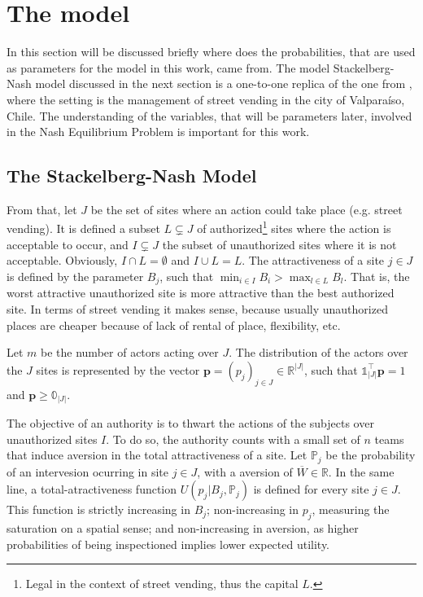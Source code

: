 \documentclass{article}
\newcommand{\pp}{\mathbf{p}}
\newcommand{\p}{\mathds{P}}
\begin{document}
\section{The model}\label{sec2}
In this section will be discussed briefly where does the probabilities, that are used as parameters for the model in this work, came from. The model Stackelberg-Nash model discussed in the next section is a one-to-one replica of the one from \citep{Carrasco}, where the setting is the management of street vending in the city of Valparaíso, Chile. The understanding of the variables, that will be parameters later, involved in the Nash Equilibrium Problem is important for this work.\par

\subsection{The Stackelberg-Nash Model}\label{sec2:SNG}
From that, let $J$ be the set of sites where an action could take place (e.g. street vending). It is defined a subset $L \subsetneq J$ of authorized\footnote{Legal in the context of street vending, thus the capital $L$.} sites where the action is acceptable to occur, and $I\subsetneq J$ the subset of unauthorized sites where it is not acceptable. Obviously, $I \cap L = \emptyset$ and $I \cup L = L$. The attractiveness of a site $j \in J$ is defined by the parameter $B_j$, such that $\min_{i \in I} B_i > \max_{l \in L} B_l$. That is, the worst attractive unauthorized site is more attractive than the best authorized site. In terms of street vending it makes sense, because usually unauthorized places are cheaper because of lack of rental of place, flexibility, etc.\par
Let $m$ be the number of actors acting over $J$. The distribution of the actors over the $J$ sites is represented by the vector $\pp = (p_j)_{j\in J} \in \mathbb{R}^{|J|}$, such that $\mathbb{1}_{|J|}^\top\pp = 1$ and $\pp \geq \mathbb{0}_{|J|}$.\par
The objective of an authority is to thwart the actions of the subjects over unauthorized sites $I$. To do so, the authority counts with a small set of $n$ teams that induce aversion in the total attractiveness of a site. Let $\p_j$ be the probability of an intervesion ocurring in site $j \in J$, with a aversion of $\overline{W} \in \mathbb{R}$. In the same line, a total-atractiveness function $U(p_j \vert B_j, \p_j)$ is defined for every site $j \in J$. This function is strictly increasing in $B_j$; non-increasing in $p_j$, measuring the saturation on a spatial sense; and non-increasing in aversion, as higher probabilities of being inspectioned implies lower expected utility.\par
\end{document}
